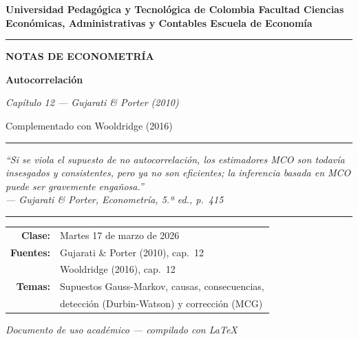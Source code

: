 \documentclass[12pt,a4paper]{article}
\theoremstyle{definition}
\theoremstyle{remark}
\begin{document}
\begin{titlepage}
  \centering
  \vspace*{1.5cm}

  {\Large\bfseries Universidad Pedagógica y Tecnológica de Colombia
Facultad Ciencias Económicas, Administrativas y Contables
Escuela de Economía\par}
  \vspace{0.4cm}
  \noindent\rule{\textwidth}{1.2pt}
  \vspace{0.8cm}

  {\LARGE\bfseries NOTAS DE ECONOMETRÍA\par}
  \vspace{0.5cm}
  {\huge\bfseries Autocorrelación\par}
  \vspace{0.3cm}
  {\large\itshape Capítulo 12 — Gujarati \& Porter (2010)\par}
  \vspace{0.3cm}
  {\normalsize Complementado con Wooldridge (2016)\par}

  \vspace{1.2cm}
  \noindent\rule{\textwidth}{0.4pt}
  \vspace{1cm}

  \begin{minipage}{0.85\textwidth}
    \centering
    \itshape
    ``Si se viola el supuesto de no autocorrelación, los estimadores MCO
    son todavía insesgados y consistentes, pero ya no son eficientes;
    la inferencia basada en MCO puede ser gravemente engañosa.''\\[4pt]
    \upshape\small — Gujarati \& Porter, \textit{Econometría}, 5.ª ed., p.~415
  \end{minipage}

  \vspace{1.2cm}
  \noindent\rule{\textwidth}{0.4pt}
  \vspace{0.8cm}

  {\normalsize
    \begin{tabular}{rl}
      \textbf{Clase:}    & Martes 17 de marzo de 2026 \\[4pt]
      \textbf{Fuentes:}  & Gujarati \& Porter (2010), cap.~12 \\
                         & Wooldridge (2016), cap.~12 \\[4pt]
      \textbf{Temas:}    & Supuestos Gauss-Markov, causas, consecuencias,\\
                         & detección (Durbin-Watson) y corrección (MCG)
    \end{tabular}
  }

  \vfill
  {\small\textit{Documento de uso académico — compilado con \LaTeX{}}}
\end{titlepage}
\end{document}
